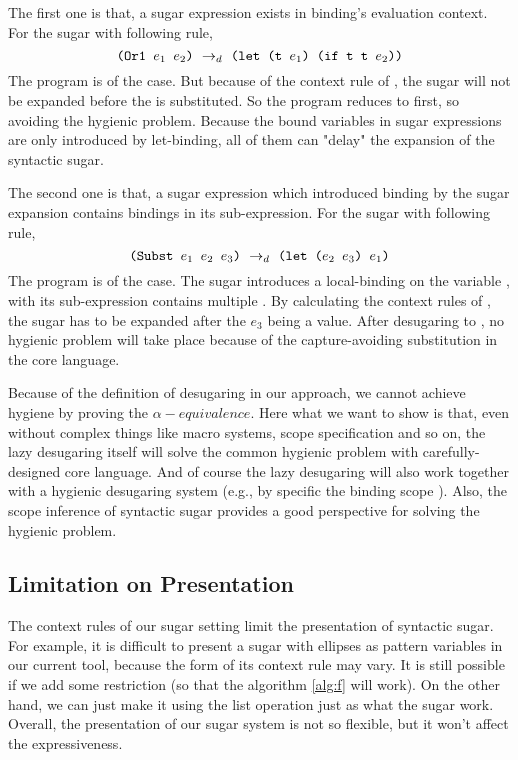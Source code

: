 The first one is that, a sugar expression exists in binding's evaluation context. For the sugar  with following rule,
\[\texttt{(Or1~$e_1$~$e_2$)} ~\rightarrow_d~ \texttt{(let (t $e_1$) (if t t $e_2$))}\]
The program  is of the case. But because of the context rule of , the sugar  will not be expanded before the  is substituted. So the program reduces to  first, so avoiding the hygienic problem. Because the bound variables in sugar expressions are only introduced by let-binding, all of them can "delay" the expansion of the syntactic sugar.

The second one is that, a sugar expression which introduced binding by the sugar expansion contains bindings in its sub-expression. For the sugar  with following rule,
\[
\texttt{(Subst $e_1$ $e_2$ $e_3$)} ~\rightarrow_d~ \texttt{(let ($e_2$ $e_3$) $e_1$)}
\]
The program  is of the case. The sugar introduces a local-binding on the variable , with its sub-expression contains multiple . By calculating the context rules of , the sugar has to be expanded after the $e_3$ being a value. After desugaring to ,  no hygienic problem will take place because of the capture-avoiding substitution in the core language.

Because of the definition of desugaring in our approach, we cannot achieve hygiene by proving the $\alpha-equivalence$.
Here what we want to show is that, even without complex things like macro systems, scope specification and so on, the lazy desugaring itself will solve the common hygienic problem with carefully-designed core language. And of course the lazy desugaring will also work together with a hygienic desugaring system (e.g., by specific the binding scope \cite{10.5555/1792878.1792884}). Also, the scope inference of syntactic sugar\cite{resugaringscope} provides a good perspective for solving the hygienic problem.
\subsection{Limitation on Presentation}
The context rules of our sugar setting limit the presentation of syntactic sugar. For example, it is difficult to present a sugar with ellipses as pattern variables in our current tool, because the form of its context rule may vary. It is still possible if we add some
restriction (so that the algorithm \ref{alg:f} will work). On the other hand, we can just make it using the list operation just as what the sugar  work. Overall, the presentation of our sugar system is not so flexible, but it won't affect the expressiveness.